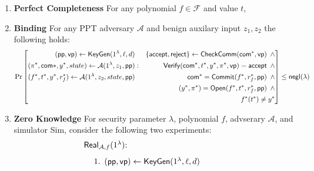 \begin{framed}
	\centering
	\begin{enumerate}
			\item \textbf{Perfect Completeness}
				For any polynomial $f \in \mathcal{F}$ and value $t$,
				{\fontsize{10}{10}{\[\Pr_{r_f}\left[
					\begin{aligned}
						(\pp, \vp) \leftarrow \KeyGen(1^\lambda, \ell, d) && \\
						\comm \leftarrow \Commit(f, r_f, \pp) &:&  \CheckComm(\comm, \vp)=\accept \hspace*{5pt}\land \\
						(y, \pi) \leftarrow \Open(f, t, r_f, \pp) && \hspace*{10pt}\Verify(\comm, t, y, \pi, \vp)=\accept\\
					\end{aligned}
				\right]=1\]}}
			\item \textbf{Binding}
			For any PPT adversary $\mathcal{A}$ and benign auxilary input $z_1, z_2$ the following holds:
			{\fontsize{9}{9}\[\Pr \left[
				\begin{aligned}
					(\mathsf{pp}, \mathsf{vp}) \leftarrow \mathsf{KeyGen}(1^\lambda, \ell, d) && \{\mathsf{accept},\mathsf{reject}\}\leftarrow\mathsf{CheckComm}({{\sf com}}^*, \mathsf{vp}) \hspace*{5pt}\land\\
					(\pi^*, {{\sf com}}*, y^*, state) \leftarrow \mathcal{A}(1^\lambda, z_1, \mathsf{pp}) &:& \mathsf{Verify}({{\sf com}}^*, t^*, y^*, \pi^*, \mathsf{vp})=\mathsf{accept} \hspace*{5pt} \land\\
					(f^*, t^*, y^*, r_f^*) \leftarrow \mathcal{A}(1^\lambda, z_2, state, \mathsf{pp}) && {{\sf com}}^*=\mathsf{Commit}(f^*, r_f^*, \mathsf{pp}) \hspace*{5pt} \land\\
					&& (y^*, \pi^*) = \mathsf{Open}(f^*, t^*, r_f^*, \mathsf{pp}) \hspace*{5pt} \land \\
					&& f^*(t^*) \neq y^*\\
				\end{aligned}
			\right]\le {\sf negl}{(\lambda)}\]}
			\item \textbf{Zero Knowledge} For security parameter $\lambda$, polynomial $f$, advserary $\mathcal{A}$, and simulator Sim, consider the following two experiments:
				\begin{align*}
					\begin{minipage}{.5\linewidth}
						$\mathsf{Real}_{\A, f}(1^\lambda)$:
						\begin{enumerate}
							\item $(\pp, \vp) \leftarrow \KeyGen(1^\lambda, \ell, d)$

\end{enumerate}
\end{minipage}
\end{align*}
\end{enumerate}
\end{framed}

